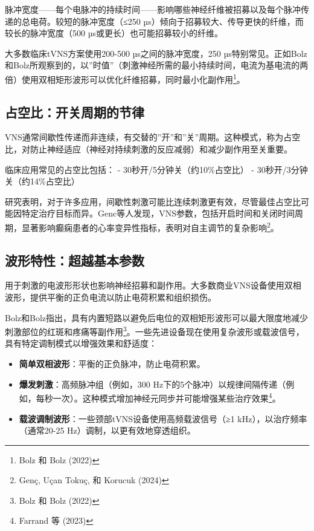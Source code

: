 \documentclass[
  Letterpaper,
]{scrbook}
\providecommand{\tightlist}{%
  \setlength{\itemsep}{0pt}\setlength{\parskip}{0pt}}\usepackage{longtable,booktabs,array}
\begin{document}
脉冲宽度------每个电脉冲的持续时间------影响哪些神经纤维被招募以及每个脉冲传递的总电荷。较短的脉冲宽度（≤250
µs）倾向于招募较大、传导更快的纤维，而较长的脉冲宽度（500
µs或更长）也可能招募较小的纤维。

大多数临床tVNS方案使用200-500 µs之间的脉冲宽度，250
µs特别常见。正如Bolz和Bolz所观察到的，以''时值''（刺激神经所需的最小持续时间，电流为基电流的两倍）使用双相矩形波形可以优化纤维招募，同时最小化副作用\footnote{Bolz
  和 Bolz (2022)}。

\subsection{占空比：开关周期的节律}\label{ux5360ux7a7aux6bd4ux5f00ux5173ux5468ux671fux7684ux8282ux5f8b}

VNS通常间歇性传递而非连续，有交替的''开''和''关''周期。这种模式，称为占空比，对防止神经适应（神经对持续刺激的反应减弱）和减少副作用至关重要。

临床应用常见的占空比包括： - 30秒开/5分钟关（约10\%占空比） -
30秒开/3分钟关（约14\%占空比）

研究表明，对于许多应用，间歇性刺激可能比连续刺激更有效，尽管最佳占空比可能因特定治疗目标而异。Genc等人发现，VNS参数，包括开启时间和关闭时间周期，显著影响癫痫患者的心率变异性指标，表明对自主调节的复杂影响\footnote{Genç,
  Uçan Tokuç, 和 Korucuk (2024)}。

\subsection{波形特性：超越基本参数}\label{ux6ce2ux5f62ux7279ux6027ux8d85ux8d8aux57faux672cux53c2ux6570}

用于刺激的电波形形状也影响神经招募和副作用。大多数商业VNS设备使用双相波形，提供平衡的正负电流以防止电荷积累和组织损伤。

Bolz和Bolz指出，具有内置短路以避免后电位的双相矩形波形可以最大限度地减少刺激部位的红斑和疼痛等副作用\footnote{Bolz
  和 Bolz (2022)}。一些先进设备现在使用复杂波形或载波信号，具有特定调制模式以增强效果和舒适度：

\begin{itemize}
\tightlist
\item
  \textbf{简单双相波形}：平衡的正负脉冲，防止电荷积累。
\item
  \textbf{爆发刺激}：高频脉冲组（例如，300
  Hz下的5个脉冲）以规律间隔传递（例如，每秒一次）。这种模式增加神经元同步并可能增强某些治疗效果\footnote{Farrand
    等 (2023)}。
\item
  \textbf{载波调制波形}：一些颈部tVNS设备使用高频载波信号（≥1
  kHz），以治疗频率（通常20-25 Hz）调制，以更有效地穿透组织。
\end{itemize}
\end{document}
